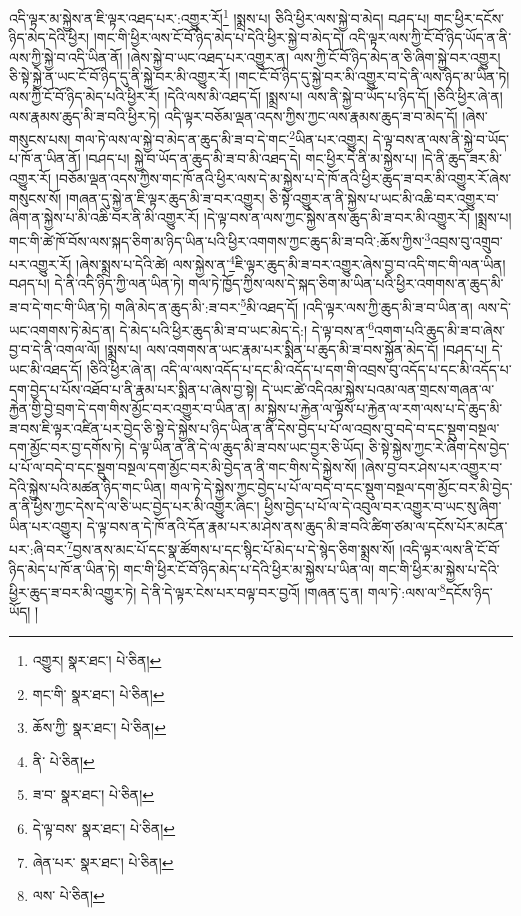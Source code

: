 འདི་ལྟར་མ་སྐྱེས་ན་ཇི་ལྟར་འཐད་པར་:འགྱུར་རོ།\footnote{འགྱུར།  སྣར་ཐང་།  པེ་ཅིན། } །སྨྲས་པ། ཅིའི་ཕྱིར་ལས་སྐྱེ་བ་མེད། བཤད་པ། གང་ཕྱིར་དངོས་ཉིད་མེད་དེའི་ཕྱིར། །གང་གི་ཕྱིར་ལས་ངོ་བོ་ཉིད་མེད་པ་དེའི་ཕྱིར་སྐྱེ་བ་མེད་དེ། འདི་ལྟར་ལས་ཀྱི་ངོ་བོ་ཉིད་ཡོད་ན་ནི་ལས་ཀྱི་སྐྱེ་བ་འདི་ཡིན་ནོ། །ཞེས་སྐྱེ་བ་ཡང་འཐད་པར་འགྱུར་ན། ལས་ཀྱི་ངོ་བོ་ཉིད་མེད་ན་ཅི་ཞིག་སྐྱེ་བར་འགྱུར། ཅི་སྟེ་སྐྱེ་ན་ཡང་ངོ་བོ་ཉིད་དུ་ནི་སྐྱེ་བར་མི་འགྱུར་རོ། །གང་ངོ་བོ་ཉིད་དུ་སྐྱེ་བར་མི་འགྱུར་བ་དེ་ནི་ལས་ཉིད་མ་ཡིན་ཏེ། ལས་ཀྱི་ངོ་བོ་ཉིད་མེད་པའི་ཕྱིར་རོ། །དེའི་ལས་མི་འཐད་དོ། །སྨྲས་པ། ལས་ནི་སྐྱེ་བ་ཡོད་པ་ཉིད་དོ། །ཅིའི་ཕྱིར་ཞེ་ན། ལས་རྣམས་ཆུད་མི་ཟ་བའི་ཕྱིར་ཏེ། འདི་ལྟར་བཅོམ་ལྡན་འདས་ཀྱིས་ཀྱང་ལས་རྣམས་ཆུད་ཟ་བ་མེད་དོ། །ཞེས་གསུངས་པས། གལ་ཏེ་ལས་ལ་སྐྱེ་བ་མེད་ན་ཆུད་མི་ཟ་བ་དེ་གང་\footnote{གང་གི་  སྣར་ཐང་།  པེ་ཅིན། }ཡིན་པར་འགྱུར། དེ་ལྟ་བས་ན་ལས་ནི་སྐྱེ་བ་ཡོད་པ་ཁོ་ན་ཡིན་ནོ། །བཤད་པ། སྐྱེ་བ་ཡོད་ན་ཆུད་མི་ཟ་བ་མི་འཐད་དེ། གང་ཕྱིར་དེ་ནི་མ་སྐྱེས་པ། །དེ་ནི་ཆུད་ཟར་མི་འགྱུར་རོ། །བཅོམ་ལྡན་འདས་ཀྱིས་གང་ཁོ་ནའི་ཕྱིར་ལས་དེ་མ་སྐྱེས་པ་དེ་ཁོ་ནའི་ཕྱིར་ཆུད་ཟ་བར་མི་འགྱུར་རོ་ཞེས་གསུངས་སོ། །གཞན་དུ་སྐྱེ་ན་ཇི་ལྟར་ཆུད་མི་ཟ་བར་འགྱུར། ཅི་སྟེ་འགྱུར་ན་ནི་སྐྱེས་པ་ཡང་མི་འཆི་བར་འགྱུར་བ་ཞིག་ན་སྐྱེས་པ་མི་འཆི་བར་ནི་མི་འགྱུར་རོ། །དེ་ལྟ་བས་ན་ལས་ཀྱང་སྐྱེས་ནས་ཆུད་མི་ཟ་བར་མི་འགྱུར་རོ། །སྨྲས་པ། གང་གི་ཚེ་ཁོ་བོས་ལས་སྐད་ཅིག་མ་ཉིད་ཡིན་པའི་ཕྱིར་འགགས་ཀྱང་ཆུད་མི་ཟ་བའི་:ཆོས་ཀྱིས་\footnote{ཆོས་ཀྱི་  སྣར་ཐང་།  པེ་ཅིན། }འབྲས་བུ་འགྲུབ་པར་འགྱུར་རོ། །ཞེས་སྨྲས་པ་དེའི་ཚེ། ལས་སྐྱེས་ན་\footnote{ནི་  པེ་ཅིན། }ཇི་ལྟར་ཆུད་མི་ཟ་བར་འགྱུར་ཞེས་བྱ་བ་འདི་གང་གི་ལན་ཡིན། བཤད་པ། དེ་ནི་འདི་ཉིད་ཀྱི་ལན་ཡིན་ཏེ། གལ་ཏེ་ཁྱོད་ཀྱིས་ལས་དེ་སྐད་ཅིག་མ་ཡིན་པའི་ཕྱིར་འགགས་ན་ཆུད་མི་ཟ་བ་དེ་གང་གི་ཡིན་ཏེ། གཞི་མེད་ན་ཆུད་མི་:ཟ་བར་\footnote{ཟ་བ་  སྣར་ཐང་།  པེ་ཅིན། }མི་འཐད་དོ། །འདི་ལྟར་ལས་ཀྱི་ཆུད་མི་ཟ་བ་ཡིན་ན། ལས་དེ་ཡང་འགགས་ཏེ་མེད་ན། དེ་མེད་པའི་ཕྱིར་ཆུད་མི་ཟ་བ་ཡང་མེད་དེ:། དེ་ལྟ་བས་ན་\footnote{དེ་ལྟ་བས་  སྣར་ཐང་།  པེ་ཅིན། }འགག་པའི་ཆུད་མི་ཟ་བ་ཞེས་བྱ་བ་དེ་ནི་འགལ་ལོ། །སྨྲས་པ། ལས་འགགས་ན་ཡང་རྣམ་པར་སྨིན་པ་ཆུད་མི་ཟ་བས་སྐྱོན་མེད་དོ། །བཤད་པ། དེ་ཡང་མི་འཐད་དོ། །ཅིའི་ཕྱིར་ཞེ་ན། འདི་ལ་ལས་འདོད་པ་དང་མི་འདོད་པ་དག་གི་འབྲས་བུ་འདོད་པ་དང་མི་འདོད་པ་དག་བྱེད་པ་པོས་འཐོབ་པ་ནི་རྣམ་པར་སྨིན་པ་ཞེས་བྱ་སྟེ། དེ་ཡང་ཚེ་འདིའམ་སྐྱེས་པའམ་ལན་གྲངས་གཞན་ལ་རྐྱེན་གྱི་བྱེ་བྲག་དེ་དག་གིས་མྱོང་བར་འགྱུར་བ་ཡིན་ན། མ་སྐྱེས་པ་རྐྱེན་ལ་ལྟོས་པ་རྐྱེན་ལ་རག་ལས་པ་དེ་ཆུད་མི་ཟ་བས་ཇི་ལྟར་འཛིན་པར་བྱེད་ཅི་སྟེ་དེ་སྐྱེས་པ་ཉིད་ཡིན་ན་ནི་དེས་བྱེད་པ་པོ་ལ་འབྲས་བུ་བདེ་བ་དང་སྡུག་བསྔལ་དག་མྱོང་བར་བྱ་དགོས་ཏེ། དེ་ལྟ་ཡིན་ན་ནི་དེ་ལ་ཆུད་མི་ཟ་བས་ཡང་བྱར་ཅི་ཡོད། ཅི་སྟེ་སྐྱེས་ཀྱང་རེ་ཞིག་དེས་བྱེད་པ་པོ་ལ་བདེ་བ་དང་སྡུག་བསྔལ་དག་མྱོང་བར་མི་བྱེད་ན་ནི་གང་གིས་དེ་སྐྱེས་སོ། །ཞེས་བྱ་བར་ཤེས་པར་འགྱུར་བ་དེའི་སྐྱེས་པའི་མཚན་ཉིད་གང་ཡིན། གལ་ཏེ་དེ་སྐྱེས་ཀྱང་བྱེད་པ་པོ་ལ་བདེ་བ་དང་སྡུག་བསྔལ་དག་མྱོང་བར་མི་བྱེད་ན་ནི་ཕྱིས་ཀྱང་དེས་དེ་ལ་ཅི་ཡང་བྱེད་པར་མི་འགྱུར་ཞིང་། ཕྱིས་བྱེད་པ་པོ་ལ་དེ་འབུལ་བར་འགྱུར་བ་ཡང་སུ་ཞིག་ཡིན་པར་འགྱུར། དེ་ལྟ་བས་ན་དེ་ཁོ་ནའི་དོན་རྣམ་པར་མ་ཤེས་ནས་ཆུད་མི་ཟ་བའི་ཚིག་ཙམ་ལ་དངོས་པོར་མངོན་པར་:ཞི་བར་\footnote{ཞེན་པར་  སྣར་ཐང་།  པེ་ཅིན། }བྱས་ནས་མང་པོ་དང་སྣ་ཚོགས་པ་དང་སྙིང་པོ་མེད་པ་དེ་སྙེད་ཅིག་སྨྲས་སོ། །འདི་ལྟར་ལས་ནི་ངོ་བོ་ཉིད་མེད་པ་ཁོ་ན་ཡིན་ཏེ། གང་གི་ཕྱིར་ངོ་བོ་ཉིད་མེད་པ་དེའི་ཕྱིར་མ་སྐྱེས་པ་ཡིན་ལ། གང་གི་ཕྱིར་མ་སྐྱེས་པ་དེའི་ཕྱིར་ཆུད་ཟ་བར་མི་འགྱུར་ཏེ། དེ་ནི་དེ་ལྟར་ངེས་པར་བལྟ་བར་བྱའོ། །གཞན་དུ་ན། གལ་ཏེ་:ལས་ལ་\footnote{ལས་  པེ་ཅིན། }དངོས་ཉིད་ཡོད། །
